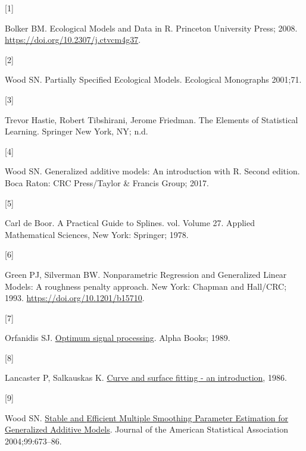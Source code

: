 \documentclass[
11pt, %
oneside, %
english, %
singlespacing, %
]{macthesis} %
\newlength{\cslhangindent}
\newlength{\csllabelwidth}
\newenvironment{CSLReferences}[2] %
{\begin{list}{}{%
	\setlength{\itemindent}{0pt}
	\setlength{\leftmargin}{0pt}
	\setlength{\parsep}{0pt}
	\ifodd #1
	\setlength{\leftmargin}{\cslhangindent}
	\setlength{\itemindent}{-1\cslhangindent}
	\fi
	\setlength{\itemsep}{#2\baselineskip}}}
{\end{list}}
\newcommand{\CSLLeftMargin}[1]{\parbox[t]{\csllabelwidth}{\strut#1\strut}}
\newcommand{\CSLRightInline}[1]{\parbox[t]{\linewidth - \csllabelwidth}{\strut#1\strut}}
\begin{document}
\label{refs}
\begin{CSLReferences}{0}{0}
\CSLLeftMargin{{[}1{]} }%
\CSLRightInline{Bolker BM. Ecological {Models} and {Data} in {R}. Princeton University Press; 2008. \url{https://doi.org/10.2307/j.ctvcm4g37}.}

\CSLLeftMargin{{[}2{]} }%
\CSLRightInline{Wood SN. Partially {Specified Ecological Models}. Ecological Monographs 2001;71.}

\CSLLeftMargin{{[}3{]} }%
\CSLRightInline{Trevor Hastie, Robert Tibshirani, Jerome Friedman. The {Elements} of {Statistical Learning}. Springer New York, NY; n.d.}

\CSLLeftMargin{{[}4{]} }%
\CSLRightInline{Wood SN. Generalized additive models: An introduction with {R}. Second edition. Boca Raton: CRC Press/Taylor \& Francis Group; 2017.}

\CSLLeftMargin{{[}5{]} }%
\CSLRightInline{Carl de Boor. A {Practical Guide} to {Splines}. vol. Volume 27. Applied Mathematical Sciences, New York: Springer; 1978.}

\CSLLeftMargin{{[}6{]} }%
\CSLRightInline{Green PJ, Silverman BW. Nonparametric {Regression} and {Generalized Linear Models}: {A} roughness penalty approach. New York: {Chapman and Hall/CRC}; 1993. \url{https://doi.org/10.1201/b15710}.}

\CSLLeftMargin{{[}7{]} }%
\CSLRightInline{Orfanidis SJ. \href{https://books.google.ca/books?id=rrJ5AAAACAAJ}{Optimum signal processing}. Alpha Books; 1989.}

\CSLLeftMargin{{[}8{]} }%
\CSLRightInline{Lancaster P, Salkauskas K. \href{https://www.semanticscholar.org/paper/Curve-and-surface-fitting-an-introduction-Lancaster-Salkauskas/4a9d7f41851cdec947175a22fde29037a8eabd45}{Curve and surface fitting - an introduction}, 1986.}

\CSLLeftMargin{{[}9{]} }%
\CSLRightInline{Wood SN. \href{https://www.jstor.org/stable/27590439}{Stable and {Efficient Multiple Smoothing Parameter Estimation} for {Generalized Additive Models}}. Journal of the American Statistical Association 2004;99:673--86.}


\end{CSLReferences}
\end{document}
